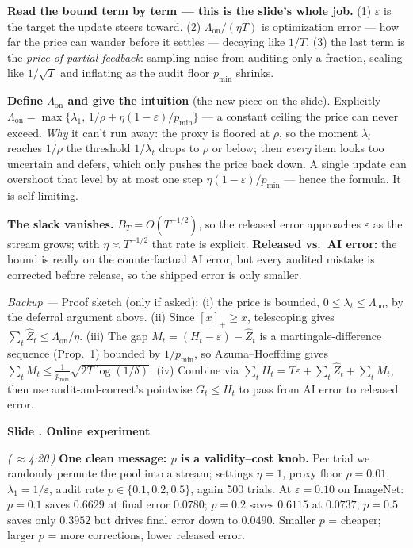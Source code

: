 \documentclass[11pt]{article}
\newcommand{\eps}{\varepsilon}
\newcommand{\cue}[1]{\textcolor{blue!60!black}{\textbf{#1}}}
\newcommand{\timecue}[1]{\hfill{\small\itshape(\,$\approx$#1\,)}}
\newcommand{\backup}[1]{{\small\textcolor{black!72}{\textit{Backup --- } #1}}}
\renewcommand{\thesection}{\arabic{section}}
\renewcommand{\section}[1]{%
  \refstepcounter{section}%
  \par\vspace{0.6\baselineskip}%
  {\large\bfseries\color{blue!45!black}Slide \thesection. #1}\par
  \vspace{0.2\baselineskip}}
\begin{document}
\cue{Read the bound term by term --- this is the slide's whole job.} (1) $\eps$
is the target the update steers toward. (2) $\Lambda_{\mathrm{on}}/(\eta T)$ is
optimization error --- how far the price can wander before it settles --- decaying
like $1/T$. (3) the last term is the \emph{price of partial feedback}: sampling
noise from auditing only a fraction, scaling like $1/\sqrt T$ and inflating as
the audit floor $p_{\min}$ shrinks.

\cue{Define $\Lambda_{\mathrm{on}}$ and give the intuition} (the new piece on the
slide). Explicitly $\Lambda_{\mathrm{on}}=\max\{\lambda_1,\,
1/\rho+\eta(1-\eps)/p_{\min}\}$ --- a constant ceiling the price can never exceed.
\emph{Why} it can't run away: the proxy is floored at $\rho$, so the moment
$\lambda_t$ reaches $1/\rho$ the threshold $1/\lambda_t$ drops to $\rho$ or below;
then \emph{every} item looks too uncertain and defers, which only pushes the
price back down. A single update can overshoot that level by at most one step
$\eta(1-\eps)/p_{\min}$ --- hence the formula. It is self-limiting.

\cue{The slack vanishes.} $B_T=O(T^{-1/2})$, so the released error approaches
$\eps$ as the stream grows; with $\eta\asymp T^{-1/2}$ that rate is explicit.
\cue{Released vs.\ AI error:} the bound is really on the counterfactual AI error,
but every audited mistake is corrected before release, so the shipped error is
only smaller.

\backup{Proof sketch (only if asked): (i) the price is bounded,
$0\le\lambda_t\le\Lambda_{\mathrm{on}}$, by the deferral argument above. (ii)
Since $[x]_+\ge x$, telescoping gives $\sum_t\widehat
Z_t\le\Lambda_{\mathrm{on}}/\eta$. (iii) The gap $M_t=(H_t-\eps)-\widehat Z_t$ is
a martingale-difference sequence (Prop.\ 1) bounded by $1/p_{\min}$, so
Azuma--Hoeffding gives $\sum_t M_t\le\frac{1}{p_{\min}}\sqrt{2T\log(1/\delta)}$.
(iv) Combine via $\sum_t H_t=T\eps+\sum_t\widehat Z_t+\sum_t M_t$, then use
audit-and-correct's pointwise $G_t\le H_t$ to pass from AI error to released
error.}

\section{Online experiment}
\timecue{4:20}
\cue{One clean message: $p$ is a validity--cost knob.} Per trial we randomly
permute the pool into a stream; settings $\eta=1$, proxy floor $\rho=0.01$,
$\lambda_1=1/\eps$, audit rate $p\in\{0.1,0.2,0.5\}$, again 500 trials. At
$\eps=0.10$ on ImageNet: $p=0.1$ saves $0.6629$ at final error $0.0780$;
$p=0.2$ saves $0.6115$ at $0.0737$; $p=0.5$ saves only $0.3952$ but drives final
error down to $0.0490$. Smaller $p$ = cheaper; larger $p$ = more corrections,
lower released error.
\end{document}
